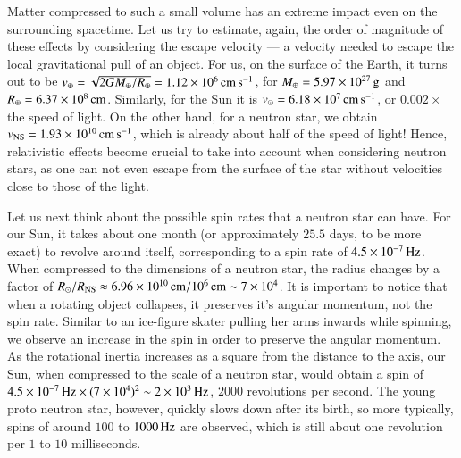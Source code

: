 Matter compressed to such a small volume has an extreme impact even on the surrounding spacetime. %
Let us try to estimate, again, the order of magnitude of these effects by considering the escape velocity --- a velocity needed to escape the local gravitational pull of an object.
For us, on the surface of the Earth, it turns out to be $v_{\mathrm{\oplus}} = \sqrt{2G M_{\oplus} / R_{\oplus}} = 1.12 \times 10^{6} \, \mathrm{cm}\,\mathrm{s}^{-1}$, for $M_{\oplus} = 5.97 \times 10^{27} \, \mathrm{g}$ and $R_{\oplus} = 6.37 \times 10^{8} \, \mathrm{cm}$.
Similarly, for the Sun it is $v_{\odot} = 6.18 \times 10^{7} \, \mathrm{cm}\,\mathrm{s}^{-1}$, or $0.002 \times$ the speed of light.
On the other hand, for a neutron star, we obtain $v_{\mathrm{NS}} = 1.93 \times 10^{10} \, \mathrm{cm}\,\mathrm{s}^{-1}$, which is already about half of the speed of light!
Hence, relativistic effects become crucial to take into account when considering neutron stars, as one can not even escape from the surface of the star without velocities close to those of the light.


Let us next think about the possible spin rates that a neutron star can have. %
For our Sun, it takes about one month (or approximately $25.5$ days, to be more exact) to revolve around itself, corresponding to a spin rate of $4.5 \times 10^{-7}\, \mathrm{Hz}$.
When compressed to the dimensions of a neutron star, the radius changes by a factor of $R_{\odot} / R_{\mathrm{NS}} \approx 6.96 \times 10^{10}\, \mathrm{cm} / 10^6 \, \mathrm{cm} \sim 7 \times 10^{4}$.
It is important to notice that when a rotating object collapses, it preserves it's angular momentum, not the spin rate.
Similar to an ice-figure skater pulling her arms inwards while spinning, we observe an increase in the spin in order to preserve the angular momentum.
As the rotational inertia increases as a square from the distance to the axis, our Sun, when compressed to the scale of a neutron star, would obtain a spin of $4.5 \times 10^{-7}\, \mathrm{Hz} \times (7 \times 10^{4})^2 \sim 2 \times 10^{3} \, \mathrm{Hz}$, $2000$ revolutions per second.
The young proto neutron star, however, quickly slows down after its birth, so more typically, spins of around $100$ to $1000 \, \mathrm{Hz}$ are observed, which is still about one revolution per $1$ to $10$ milliseconds.


